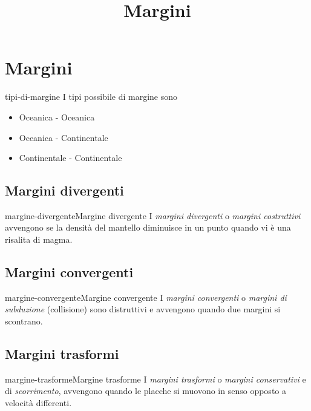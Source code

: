 \documentclass[preview]{standalone}
\begin{document}
\title{Margini}
\genpage

\section{Margini}

\begin{snippet}{tipi-di-margine}
    I tipi possibile di margine sono
    \begin{itemize}
        \item Oceanica - Oceanica
        \item Oceanica - Continentale
        \item Continentale - Continentale
    \end{itemize}
\end{snippet}

\subsection{Margini divergenti}

\begin{snippetdefinition}{margine-divergente}{Margine divergente}
    I \textit{margini divergenti} o \textit{margini costruttivi} avvengono se
    la densità del mantello diminuisce in un punto quando vi è una risalita di magma.
\end{snippetdefinition}


\subsection{Margini convergenti}

\begin{snippetdefinition}{margine-convergente}{Margine convergente}
    I \textit{margini convergenti} o \textit{margini di subduzione} (collisione) sono distruttivi e
    avvengono quando due margini si scontrano.
\end{snippetdefinition}



\subsection{Margini trasformi}

\begin{snippetdefinition}{margine-trasforme}{Margine trasforme}
    I \textit{margini trasformi} o \textit{margini conservativi} e di \textit{scorrimento},
    avvengono quando le placche si muovono in senso opposto a velocità differenti.
\end{snippetdefinition}


\end{document}
